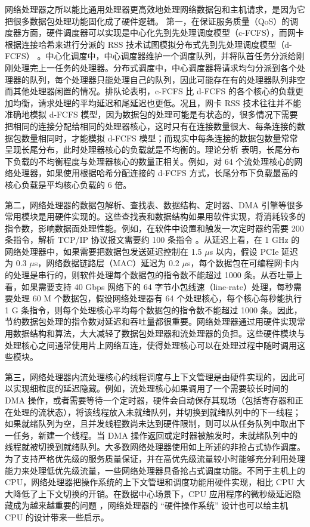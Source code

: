 网络处理器之所以能比通用处理器更高效地处理网络数据包和主机请求，是因为它把很多数据包处理功能固化成了硬件逻辑。
第一，在保证服务质量（QoS）的调度器方面，硬件调度器可以实现是中心化先到先处理调度模型（c-FCFS），而网卡根据连接哈希来进行分派的 RSS 技术试图模拟分布式先到先处理调度模型（d-FCFS） \cite{kaffes2019shinjuku,ousterhout2019shenango}。中心化调度中，中心调度器维护一个调度队列，并将队首任务分派给刚刚处理完上一任务的处理器。分布式调度中，中心调度器将请求均匀分派到各个处理器的队列，每个处理器只能处理自己的队列，因此可能存在有的处理器队列非空而其他处理器闲置的情况。排队论表明，c-FCFS 比 d-FCFS 的各个核心的负载更加均衡，请求处理的平均延迟和尾延迟也更低。况且，网卡 RSS 技术往往并不能准确地模拟 d-FCFS 模型，因为数据包的处理可能是有状态的，很多情况下需要把相同的连接分配给相同的处理器核心，这时只有在连接数量很大、每条连接的数据包数量相同时，才能模拟 d-FCFS 模型；而现实中每条连接的数据包数量常常呈现长尾分布，此时处理器核心的负载就是不均衡的。理论分析 \cite{li2017kv} 表明，长尾分布下负载的不均衡程度与处理器核心的数量正相关。例如，对 64 个流处理核心的网络处理器，如果使用根据哈希分配连接的 d-FCFS 方式，长尾分布下负载最高的核心负载是平均核心负载的 6 倍。

第二，网络处理器的数据包解析、查找表、数据结构、定时器、DMA 引擎等很多常用模块是用硬件实现的。这些查找表和数据结构如果用软件实现，将消耗较多的指令数，影响数据面处理性能。例如，在软件中设置和触发一次定时器约需要 200 条指令，解析 TCP/IP 协议报文需要约 100 条指令 \cite{clark1989analysis}。从延迟上看，在 1 GHz 的网络处理器中，如果需要把数据包发送延迟控制在 1.5 $\mu$s 以内，假设 PCIe 延迟为 0.3 $\mu$s，网络数据链路层（MAC）延迟为 0.2 $\mu$s，每个数据包在可编程网卡内的处理是串行的，则软件处理每个数据包的指令数不能超过 1000 条。从吞吐量上看，如果需要支持 40 Gbps 网络下的 64 字节小包线速（line-rate）处理，每秒需要处理 60 M 个数据包，假设网络处理器有 64 个处理核心，每个核心每秒能执行 1 G 条指令，则每个处理核心平均每个数据包的指令数不能超过 1000 条。因此，节约数据包处理的指令数对延迟和吞吐量都很重要。网络处理器通过用硬件实现常用数据结构和算法，大大减轻了数据包处理器和流处理器的负担。这些硬件模块与处理核心之间通常使用片上网络互连，使得处理核心可以在处理过程中随时调用这些模块。

第三，网络处理器内流处理核心的线程调度与上下文管理是由硬件实现的，因此可以实现细粒度的延迟隐藏。例如，流处理核心如果调用了一个需要较长时间的 DMA 操作，或者需要等待一个定时器，硬件会自动保存其现场（包括寄存器和正在处理的流状态），将该线程放入未就绪队列，并切换到就绪队列中的下一线程；如果就绪队列为空，且并发线程数尚未达到硬件限制，则可以从任务队列中取出下一任务，新建一个线程。当 DMA 操作返回或定时器被触发时，未就绪队列中的线程就被切换到就绪队列。大多数网络处理器使用如上所述的非抢占式协作调度。为了支持严格优先级的服务质量保证，并在高优先级流量较小时能够充分利用处理能力来处理低优先级流量，一些网络处理器具备抢占式调度功能。不同于主机上的 CPU，网络处理器把操作系统的上下文管理和调度功能用硬件实现，相比 CPU 大大降低了上下文切换的开销。在数据中心场景下，CPU 应用程序的微秒级延迟隐藏成为越来越重要的问题 \cite{barroso2017attack}，网络处理器的 ``硬件操作系统'' 设计也可以给主机 CPU 的设计带来一些启示。

